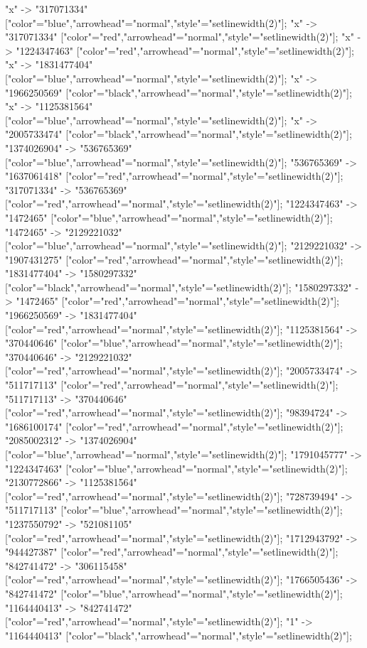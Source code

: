 {    "x" -> "317071334" ["color"="blue","arrowhead"="normal","style"="setlinewidth(2)"];
    "x" -> "317071334" ["color"="red","arrowhead"="normal","style"="setlinewidth(2)"];
    "x" -> "1224347463" ["color"="red","arrowhead"="normal","style"="setlinewidth(2)"];
    "x" -> "1831477404" ["color"="blue","arrowhead"="normal","style"="setlinewidth(2)"];
    "x" -> "1966250569" ["color"="black","arrowhead"="normal","style"="setlinewidth(2)"];
    "x" -> "1125381564" ["color"="blue","arrowhead"="normal","style"="setlinewidth(2)"];
    "x" -> "2005733474" ["color"="black","arrowhead"="normal","style"="setlinewidth(2)"];
    "1374026904" -> "536765369" ["color"="blue","arrowhead"="normal","style"="setlinewidth(2)"];
    "536765369" -> "1637061418" ["color"="red","arrowhead"="normal","style"="setlinewidth(2)"];
    "317071334" -> "536765369" ["color"="red","arrowhead"="normal","style"="setlinewidth(2)"];
    "1224347463" -> "1472465" ["color"="blue","arrowhead"="normal","style"="setlinewidth(2)"];
    "1472465" -> "2129221032" ["color"="blue","arrowhead"="normal","style"="setlinewidth(2)"];
    "2129221032" -> "1907431275" ["color"="red","arrowhead"="normal","style"="setlinewidth(2)"];
    "1831477404" -> "1580297332" ["color"="black","arrowhead"="normal","style"="setlinewidth(2)"];
    "1580297332" -> "1472465" ["color"="red","arrowhead"="normal","style"="setlinewidth(2)"];
    "1966250569" -> "1831477404" ["color"="red","arrowhead"="normal","style"="setlinewidth(2)"];
    "1125381564" -> "370440646" ["color"="blue","arrowhead"="normal","style"="setlinewidth(2)"];
    "370440646" -> "2129221032" ["color"="red","arrowhead"="normal","style"="setlinewidth(2)"];
    "2005733474" -> "511717113" ["color"="red","arrowhead"="normal","style"="setlinewidth(2)"];
    "511717113" -> "370440646" ["color"="red","arrowhead"="normal","style"="setlinewidth(2)"];
    "98394724" -> "1686100174" ["color"="red","arrowhead"="normal","style"="setlinewidth(2)"];
    "2085002312" -> "1374026904" ["color"="blue","arrowhead"="normal","style"="setlinewidth(2)"];
    "1791045777" -> "1224347463" ["color"="blue","arrowhead"="normal","style"="setlinewidth(2)"];
    "2130772866" -> "1125381564" ["color"="red","arrowhead"="normal","style"="setlinewidth(2)"];
    "728739494" -> "511717113" ["color"="blue","arrowhead"="normal","style"="setlinewidth(2)"];
    "1237550792" -> "521081105" ["color"="red","arrowhead"="normal","style"="setlinewidth(2)"];
    "1712943792" -> "944427387" ["color"="red","arrowhead"="normal","style"="setlinewidth(2)"];
    "842741472" -> "306115458" ["color"="red","arrowhead"="normal","style"="setlinewidth(2)"];
    "1766505436" -> "842741472" ["color"="blue","arrowhead"="normal","style"="setlinewidth(2)"];
    "1164440413" -> "842741472" ["color"="red","arrowhead"="normal","style"="setlinewidth(2)"];
    "1" -> "1164440413" ["color"="black","arrowhead"="normal","style"="setlinewidth(2)"];
}